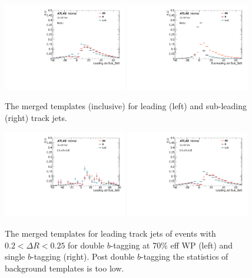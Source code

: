 \begin{figure}[htbp]
  \centering
 \includegraphics[width=0.48\textwidth]{figures/gbb/Sub_Sd0_Fits/Canv_FitTemplate_Inclusive_x.pdf}
 \includegraphics[width=0.48\textwidth]{figures/gbb/Sub_Sd0_Fits/Canv_FitTemplate_Inclusive_y.pdf}\\
\caption{The merged templates (inclusive) for leading (left) and sub-leading (right) track jets.}
  \label{fig:gbb-templates}
\end{figure}


\begin{figure}[htbp]
  \centering
 \includegraphics[width=0.48\textwidth]{figures/gbb/Canv_FitTemplate_medium.pdf}
 \includegraphics[width=0.48\textwidth]{figures/gbb/Sub_Sd0_Fits/Canv_FitTemplate_02-DeltaR-025_LpT_INF_SpT_INF_x.pdf}\\
\caption{The merged templates for leading track jets of events with $0.2<\Delta R<0.25$ for double $b$-tagging at 70\% eff WP (left) and single $b$-tagging (right). Post double $b$-tagging the statistics of background templates is too low.}
 \label{fig:gbb-template-leadtight-medium}
\end{figure}


